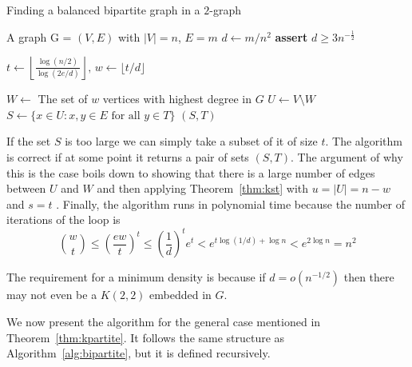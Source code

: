 \begin{algorithm}[H]
    \caption{Finding a balanced bipartite graph in a $2$-graph}
    \label{alg:bipartite}
        \begin{algorithmic}[1]
        \Require A graph G = $(V, E)$ with $|V| = n$, $E = m$
        \State $d \gets m / n^2 $
        \State \textbf{assert} $d \geq 3 n^{-\frac{1}{2}}$

        \State $t \gets \left\lfloor\frac{\log (n/2) }
        {\log (2e/d)}\right\rfloor,\, w \gets \lfloor t/d \rfloor$

        \State $W \gets $ The set of $w$ vertices with highest degree in $G$
        \State $U \gets V \setminus W$
            \State $S \gets \{x \in U : {x, y} \in E \text{ for all } y \in T\}$
                \State \Return $(S, T)$
            \EndIf
        \EndFor
        \end{algorithmic}
\end{algorithm}

If the set $S$ is too large we can simply take a subset of it of size $t$.
The algorithm is correct if at some point it returns a pair of sets $(S, T)$.
The argument of why this is the case boils down to showing that there is a
large number of edges between $U$ and $W$ and then applying Theorem~\ref{thm:kst}
with $u = |U| = n - w$ and $s = t$ .
Finally, the algorithm runs in polynomial time because 
the  number of iterations of the loop is
\[
    \binom{w}{t} \leq
    \left(\frac{ew}{t}\right)^t \leq
    \left(\frac{1}{d}\right)^t e^t < e^{t \log (1/d) + \log n} <
    e^{2\log n} = n^2
\]

\begin{remark}
    The requirement for a minimum density is because if $d = o\left(n^{-1/2}\right)$ then
    there may not even be a $K(2, 2)$ embedded in $G$. %
\end{remark}

We now present the algorithm for the general case mentioned in Theorem~\ref{thm:kpartite}.
It follows the same structure as Algorithm~\ref{alg:bipartite},
but it is defined recursively.

